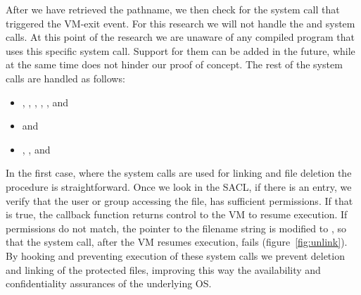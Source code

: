 \par After we have retrieved the pathname, we then check for the system call that triggered the VM-exit event. For this research we will not handle the  and  system calls. At this point of the research we are unaware of any compiled program that uses this specific system call. Support for them can be added in the future, while at the same time does not hinder our proof of concept. The rest of the system calls are handled as follows: 


\begin{itemize}
	\item {}, , , , , and 
	\item {} and 
	\item {}, , and 
\end{itemize}

\par In the first case, where the system calls are used for linking and file deletion the procedure is straightforward. Once we look in the \ac{SACL}, if there is an entry, we verify that the user or group accessing the file, has sufficient permissions. If that is true, the callback function returns control to the \ac{VM} to resume execution. If permissions do not match, the pointer to the filename string is modified to , so that the system call, after the \ac{VM} resumes execution, fails (figure~\ref{fig:unlink}). By hooking and preventing execution of these system calls we prevent deletion and linking of the protected files, improving this way the availability and confidentiality assurances of the underlying \ac{OS}.


